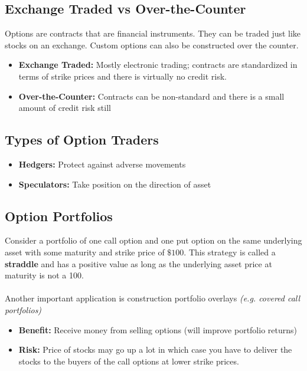 \documentclass[11pt]{article}
\begin{document}
\subsection{Exchange Traded vs Over-the-Counter}
Options are contracts that are financial instruments. They can be traded just like stocks on an exchange. Custom options can also be constructed over the counter.
\begin{itemize}
\item \textbf{Exchange Traded:} Mostly electronic trading; contracts are standardized in terms of strike prices and there is virtually no credit risk. 
\item \textbf{Over-the-Counter:} Contracts can be non-standard and there is a small amount of credit risk still 
\end{itemize}

\subsection{Types of Option Traders}
\begin{itemize}
\item \textbf{Hedgers:} Protect against adverse movements
\item \textbf{Speculators:} Take position on the direction of asset
\end{itemize}

\subsection{Option Portfolios}
Consider a portfolio of one call option and one put option on the same underlying asset with some maturity and strike price of $\$100 $. This strategy is called a \textbf{straddle} and has a positive value as long as the underlying asset price at maturity is not a 100. \\ \\ Another important application is construction portfolio overlays \textit{(e.g. covered call portfolios)}
\begin{itemize}
\item \textbf{Benefit:} Receive money from selling options (will improve portfolio returns)
\item\textbf{Risk:} Price of stocks may go up a lot in which case you have to deliver the stocks to the buyers of the call options at lower strike prices.
\end{itemize}
\end{document}
